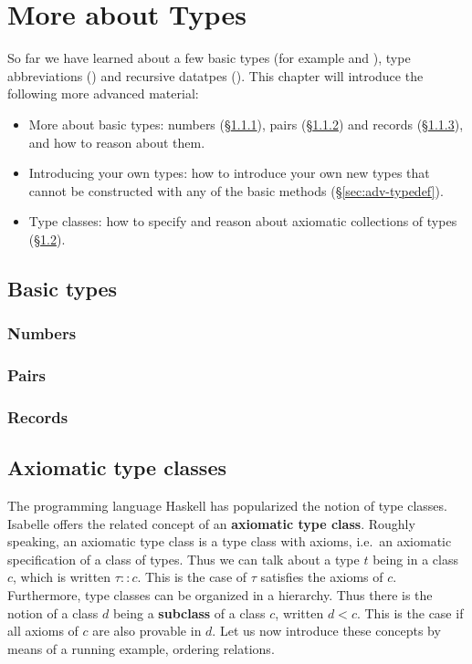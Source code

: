 \chapter{More about Types}

So far we have learned about a few basic types (for example  and
), type abbreviations () and recursive datatpes
(). This chapter will introduce the following more
advanced material:
\begin{itemize}
\item More about basic types: numbers ({\S}\ref{sec:numbers}), pairs
  ({\S}\ref{sec:products}) and records ({\S}\ref{sec:records}), and how to reason
  about them.
\item Introducing your own types: how to introduce your own new types that
  cannot be constructed with any of the basic methods ({\S}\ref{sec:adv-typedef}).
\item Type classes: how to specify and reason about axiomatic collections of
  types ({\S}\ref{sec:axclass}).
\end{itemize}

\section{Basic types}

\subsection{Numbers}
\label{sec:numbers}

\subsection{Pairs}
\label{sec:products}

\subsection{Records}
\label{sec:records}



\section{Axiomatic type classes}
\label{sec:axclass}


The programming language Haskell has popularized the notion of type classes.
Isabelle offers the related concept of an \textbf{axiomatic type class}.
Roughly speaking, an axiomatic type class is a type class with axioms, i.e.\ 
an axiomatic specification of a class of types. Thus we can talk about a type
$t$ being in a class $c$, which is written $\tau :: c$.  This is the case of
$\tau$ satisfies the axioms of $c$. Furthermore, type classes can be
organized in a hierarchy. Thus there is the notion of a class $d$ being a
\textbf{subclass} of a class $c$, written $d < c$. This is the case if all
axioms of $c$ are also provable in $d$. Let us now introduce these concepts
by means of a running example, ordering relations.

